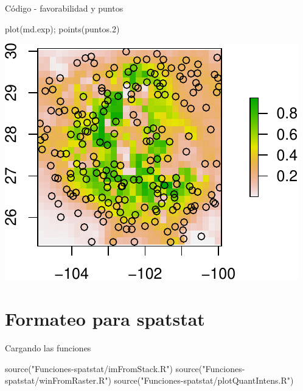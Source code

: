 \documentclass[
  11pt,
  ignorenonframetext,
]{beamer}
\newenvironment{Shaded}{}{}
\newcommand{\FloatTok}[1]{\textcolor[rgb]{0.25,0.63,0.44}{#1}}
\newcommand{\FunctionTok}[1]{\textcolor[rgb]{0.02,0.16,0.49}{#1}}
\newcommand{\NormalTok}[1]{#1}
\newcommand{\StringTok}[1]{\textcolor[rgb]{0.25,0.44,0.63}{#1}}
\begin{document}
\begin{frame}[fragile]{Código - favorabilidad y puntos}
\protect\hypertarget{cuxf3digo---favorabilidad-y-puntos}{}
\begin{Shaded}
\begin{Highlighting}[]
\FunctionTok{plot}\NormalTok{(md.exp); }\FunctionTok{points}\NormalTok{(puntos}\FloatTok{.2}\NormalTok{)}
\end{Highlighting}
\end{Shaded}

\begin{center}\includegraphics{Tutorial-spatstat-2_files/figure-beamer/unnamed-chunk-6-1} \end{center}
\end{frame}

\hypertarget{formateo-para-spatstat}{%
\section{Formateo para spatstat}\label{formateo-para-spatstat}}

\begin{frame}[fragile]{Cargando las funciones}
\protect\hypertarget{cargando-las-funciones}{}
\begin{Shaded}
\begin{Highlighting}[]
\FunctionTok{source}\NormalTok{(}\StringTok{"Funciones{-}spatstat/imFromStack.R"}\NormalTok{)}
\FunctionTok{source}\NormalTok{(}\StringTok{"Funciones{-}spatstat/winFromRaster.R"}\NormalTok{)}
\FunctionTok{source}\NormalTok{(}\StringTok{"Funciones{-}spatstat/plotQuantIntens.R"}\NormalTok{)}
\end{Highlighting}
\end{Shaded}
\end{frame}
\end{document}
